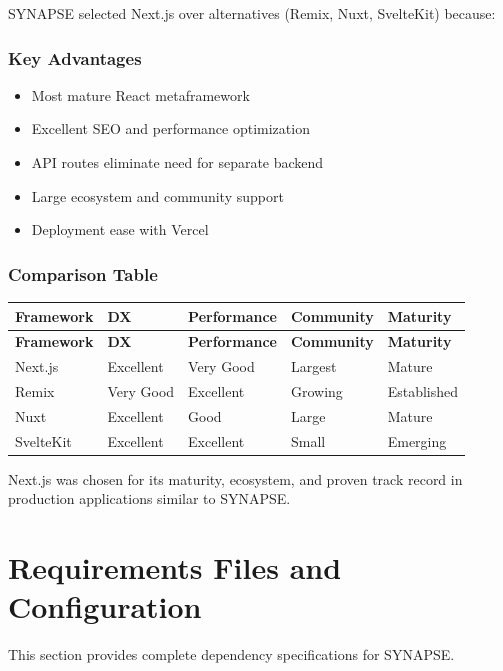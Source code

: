 \documentclass[12pt,a4paper]{report}
\begin{document}
SYNAPSE selected Next.js over alternatives (Remix, Nuxt, SvelteKit) because:

\subsection{Key Advantages}

\begin{itemize}
    \item Most mature React metaframework
    \item Excellent SEO and performance optimization
    \item API routes eliminate need for separate backend
    \item Large ecosystem and community support
    \item Deployment ease with Vercel
\end{itemize}

\subsection{Comparison Table}

\begin{longtable}{|p{2.5cm}|p{2cm}|p{2cm}|p{2cm}|p{2cm}|}
\hline
\textbf{Framework} & \textbf{DX} & \textbf{Performance} & \textbf{Community} & \textbf{Maturity} \\
\hline
\endfirsthead
\hline
\textbf{Framework} & \textbf{DX} & \textbf{Performance} & \textbf{Community} & \textbf{Maturity} \\
\hline
\endhead
\hline
\endfoot
\hline
\endlastfoot

Next.js & Excellent & Very Good & Largest & Mature \\
\hline
Remix & Very Good & Excellent & Growing & Established \\
\hline
Nuxt & Excellent & Good & Large & Mature \\
\hline
SvelteKit & Excellent & Excellent & Small & Emerging \\
\hline
\end{longtable}

Next.js was chosen for its maturity, ecosystem, and proven track record in production applications similar to SYNAPSE.

\chapter{Requirements Files and Configuration}

This section provides complete dependency specifications for SYNAPSE.
\end{document}
